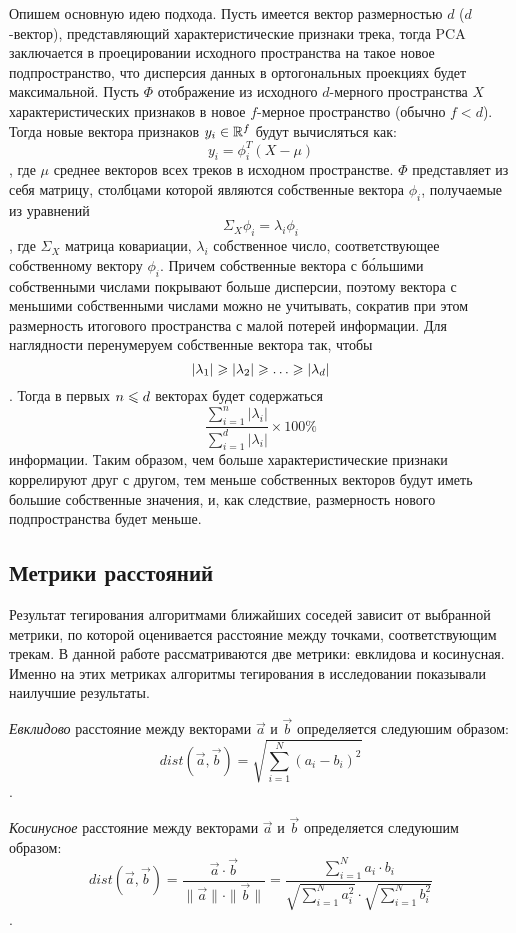 Опишем основную идею подхода. Пусть имеется вектор размерностью $d$ ($d$-вектор), представляющий характеристические признаки трека, тогда PCA заключается в проецировании исходного пространства
на такое новое подпространство, что дисперсия данных в ортогональных проекциях будет максимальной. Пусть $\Phi$ \ld отображение из исходного $d$-мерного пространства $X$ характеристических
признаков в новое $f$-мерное пространство (обычно $f < d$). Тогда новые вектора признаков $y_i \in \mathbb{R}^f$ будут вычисляться как:
$$ y_i = \phi_i^T(X - \mu) $$,
где $\mu$ \ld среднее векторов всех треков в исходном пространстве. $\Phi$ представляет из себя матрицу, столбцами которой являются собственные вектора $\phi_i$, получаемые из уравнений
$$\Sigma_X \phi_i = \lambda_i\phi_i $$,
где $\Sigma_X$ \ld матрица ковариации, $\lambda_i$ \ld собственное число, соответствующее собственному вектору $\phi_i$. Причем собственные вектора с б\'{о}льшими собственными числами покрывают
больше дисперсии, поэтому вектора с меньшими собственными числами можно не учитывать, сократив при этом размерность итогового пространства с малой потерей информации. Для наглядности 
перенумеруем собственные вектора так, чтобы
$$|\lambda_1| \geqslant |\lambda_2| \geqslant \ldots \geqslant |\lambda_d|$$.
Тогда в первых $n \leqslant d$ векторах будет содержаться 
$$\frac{\sum_{i=1}^{n} |\lambda_i|}{\sum_{i=1}^{d} |\lambda_i|} \times 100\%$$ 
информации. Таким образом, чем больше характеристические признаки коррелируют друг с другом, тем меньше собственных векторов будут иметь большие собственные значения, и, как следствие, размерность нового подпространства
будет меньше.

\subsection{Метрики расстояний}

Результат тегирования алгоритмами ближайших соседей зависит от выбранной метрики, по которой оценивается расстояние между точками, соответствующим трекам.
В данной работе рассматриваются две метрики: евклидова и косинусная. Именно на этих метриках алгоритмы тегирования в исследовании \cite{msordo_thesis} показывали наилучшие результаты.

\emph{Евклидово} расстояние между векторами $\vec{a}$ и $\vec{b}$ определяется следуюшим образом:
$$ dist(\vec{a}, \vec{b}) = \sqrt{\sum_{i=1}^{N} (a_i - b_i)^2} $$.

\emph{Косинусное} расстояние между векторами $\vec{a}$ и $\vec{b}$ определяется следуюшим образом:
$$ dist(\vec{a}, \vec{b}) = \frac{\vec{a} \cdot \vec{b}}{\| \vec{a} \| \cdot \| \vec{b} \|} = \frac{\sum_{i=1}^{N} a_i \cdot b_i}{\sqrt{\sum_{i=1}^{N} a_i^2} \cdot \sqrt{\sum_{i=1}^{N} b_i^2}} $$.


